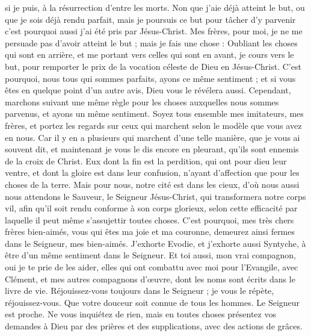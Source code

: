 \begin{multicols}{2}
si je puis, à la résurrection d'entre les morts.
Non que j'aie déjà atteint le but, ou que je sois déjà rendu parfait, mais je poursuis ce but pour tâcher d'y parvenir c'est pourquoi aussi j'ai été pris par Jésus-Christ.
Mes frères, pour moi, je ne me persuade pas d'avoir atteint le but ;
mais je fais une chose : Oubliant les choses qui sont en arrière, et me portant vers celles qui sont en avant, je cours vers le but, pour remporter le prix de la vocation céleste de Dieu en Jésus-Christ.
C'est pourquoi, nous tous qui sommes parfaits, ayons ce même sentiment ; et si vous êtes en quelque point d'un autre avis, Dieu vous le révélera aussi.
Cependant, marchons suivant une même règle pour les choses auxquelles nous sommes parvenus, et ayons un même sentiment.
Soyez tous ensemble mes imitateurs, mes frères, et portez les regards sur ceux qui marchent selon le modèle que vous avez en nous.
Car il y en a plusieurs qui marchent d'une telle manière, que je vous ai souvent dit, et maintenant je vous le dis encore en pleurant, qu'ils sont ennemis de la croix de Christ.  
Eux dont la fin est la perdition, qui ont pour dieu leur ventre, et dont la gloire est dans leur confusion, n'ayant d'affection que pour les choses de la terre.
Mais pour nous, notre cité est dans les cieux, d'où nous aussi nous attendons le Sauveur, le Seigneur Jésus-Christ,
qui transformera notre corps vil, afin qu'il soit rendu conforme à son corps glorieux, selon cette efficacité par laquelle il peut même s'assujettir toutes choses. 
\VerseOne{}C'est pourquoi, mes très chers frères bien-aimés, vous qui êtes ma joie et ma couronne, demeurez ainsi fermes dans le Seigneur, mes bien-aimés.
J'exhorte Evodie, et j'exhorte aussi Syntyche, à être d'un même sentiment dans le Seigneur.
Et toi aussi, mon vrai compagnon, oui je te prie de les aider, elles qui ont combattu avec moi pour l'Evangile, avec Clément, et mes autres compagnons d'œuvre, dont les noms sont écrits dans le livre de vie.
Réjouissez-vous toujours dans le Seigneur ; je vous le répète, réjouissez-vous.
Que votre douceur soit connue de tous les hommes. Le Seigneur est proche.
Ne vous inquiétez de rien, mais en toutes choses présentez vos demandes à Dieu par des prières et des supplications, avec des actions de grâces.

\end{multicols}
